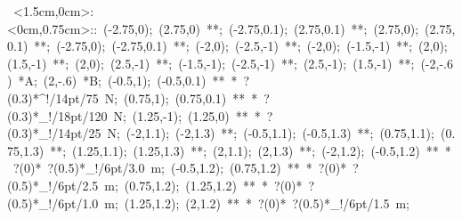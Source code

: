 
%

\hbox{
\xy    <1.5cm,0cm>:<0cm,0.75cm>::
       (-2.75,0); (2.75,0) **\dir{-};
       (-2.75,0.1); (2.75,0.1) **\dir{-};
       (2.75,0); (2.75,0.1) **\dir{-};
       (-2.75,0); (-2.75,0.1) **\dir{-};
	(-2,0); (-2.5,-1) **\dir{-};
	(-2,0); (-1.5,-1) **\dir{-};
	(2,0); (1.5,-1) **\dir{-};
	(2,0); (2.5,-1) **\dir{-};
	(-1.5,-1); (-2.5,-1) **\dir{-};
	(2.5,-1); (1.5,-1) **\dir{-};
 	(-2,-.6) *{A};
 	(2,-.6) *{B};
	(-0.5,1); (-0.5,0.1) **\dir{-} *\dir{>} ?(0.3)*^!/14pt/\hbox{75 N};
	(0.75,1); (0.75,0.1) **\dir{-} *\dir{>} ?(0.3)*_!/18pt/\hbox{120 N};
	(1.25,-1); (1.25,0) **\dir{-} *\dir{>}  ?(0.3)*_!/14pt/\hbox{25 N};
	(-2,1.1); (-2,1.3) **\dir{-};
	(-0.5,1.1); (-0.5,1.3) **\dir{-};
	(0.75,1.1); (0.75,1.3) **\dir{-};
	(1.25,1.1); (1.25,1.3) **\dir{-};
	(2,1.1); (2,1.3) **\dir{-};
	(-2,1.2); (-0.5,1.2) **\dir{-} *\dir{>} ?(0)*\dir{<} ?(0.5)*_!/6pt/\hbox{3.0 m};
	(-0.5,1.2); (0.75,1.2) **\dir{-} *\dir{>} ?(0)*\dir{<} ?(0.5)*_!/6pt/\hbox{2.5 m};
	(0.75,1.2); (1.25,1.2) **\dir{-} *\dir{>} ?(0)*\dir{<} ?(0.5)*_!/6pt/\hbox{1.0 m};
	(1.25,1.2); (2,1.2) **\dir{-} *\dir{>} ?(0)*\dir{<} ?(0.5)*_!/6pt/\hbox{1.5 m};
\endxy}


